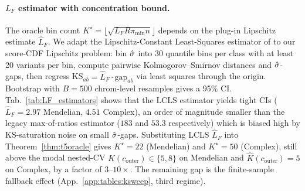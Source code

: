 \paragraph{$L_F$ estimator with concentration bound.}
The oracle bin count $K^\star = \lfloor\sqrt{L_F R \pi_{\min} n}\rfloor$ depends on the plug-in Lipschitz estimate $\hat L_F$. We adapt the Lipschitz-Constant Least-Squares estimator of \citet{lcls2024lipschitz} to our score-CDF Lipschitz problem: bin $\hat{\sigma}$ into 30 quantile bins per class with at least 20 variants per bin, compute pairwise Kolmogorov--Smirnov distances and $\hat{\sigma}$-gaps, then regress KS$_{ab} = \hat L_F \cdot \mathrm{gap}_{ab}$ via least squares through the origin. Bootstrap with $B = 500$ chrom-level resamples gives a 95\% CI. Tab.~\ref{tab:LF_estimators} shows that the LCLS estimator yields tight CIs ($\hat L_F = 2.97$ Mendelian, $4.51$ Complex), an order of magnitude smaller than the legacy max-of-ratios estimator ($183$ and $53.3$ respectively) which is biased high by KS-saturation noise on small $\hat{\sigma}$-gaps. Substituting LCLS $\hat L_F$ into Theorem~\ref{thm:t5oracle} gives $K^\star = 22$ (Mendelian) and $K^\star = 50$ (Complex), still above the modal nested-CV $\hat K(c_{\mathrm{outer}}) \in \{5, 8\}$ on Mendelian and $\hat K(c_{\mathrm{outer}}) = 5$ on Complex, by a factor of $3$--$10\times$. The remaining gap is the finite-sample fallback effect (App.~\ref{app:tables:ksweep}, third regime).

